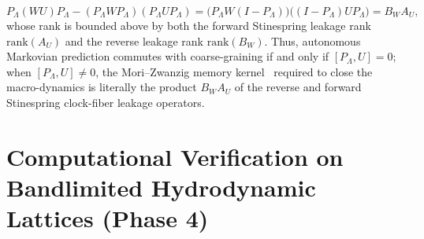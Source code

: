 \documentclass[11pt,a4paper]{article}
\theoremstyle{definition}
\begin{document}
\begin{enumerate}
\begin{equation}
P_{\Lambda} (W U) P_{\Lambda} - (P_{\Lambda} W P_{\Lambda})(P_{\Lambda} U P_{\Lambda}) = \big(P_{\Lambda} W (I - P_{\Lambda})\big)\big((I - P_{\Lambda}) U P_{\Lambda}\big) = B_W A_U,
\end{equation}
whose rank is bounded above by both the forward Stinespring leakage rank $\mathrm{rank}(A_U)$ and the reverse leakage rank $\mathrm{rank}(B_W)$. Thus, autonomous Markovian prediction commutes with coarse-graining if and only if $[P_{\Lambda}, U] = 0$; when $[P_{\Lambda}, U] \ne 0$, the Mori--Zwanzig memory kernel~\cite{zwanzig1961,mori1965} required to close the macro-dynamics is literally the product $B_W A_U$ of the reverse and forward Stinespring clock-fiber leakage operators.
\end{enumerate}
\section{Computational Verification on Bandlimited Hydrodynamic Lattices (Phase 4)}
\label{sec:phase4}
\end{document}

